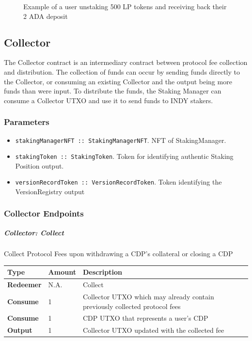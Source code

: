 \documentclass{article}
\begin{document}
\begin{sloppypar}
\hypertarget{liquidity-close-figure}{%
\begin{figure}[htbp]
\centering

\caption{Example of a user unstaking 500 LP tokens and receiving
back their 2 ADA deposit}
\label{liquidity-close-figure}
\end{figure}}

\hypertarget{collector}{%
\subsection{Collector}\label{collector}}

The Collector contract is an intermediary contract between protocol fee
collection and distribution. The collection of funds can occur by
sending funds directly to the Collector, or consuming an existing
Collector and the output being more funds than were input. To distribute
the funds, the Staking Manager can consume a Collector UTXO and use it
to send funds to INDY stakers.

\hypertarget{parameters-1}{%
\subsubsection{Parameters}\label{parameters-1}}

\begin{itemize}
\item
  \texttt{stakingManagerNFT~::~StakingManagerNFT}. NFT of
  StakingManager.
\item
  \texttt{stakingToken~::~StakingToken}. Token for identifying authentic
  Staking Position output.
\item
  \texttt{versionRecordToken~::~VersionRecordToken}. Token identifying
  the VersionRegistry output
\end{itemize}

\hypertarget{collector-endpoints}{%
\subsubsection{Collector Endpoints}\label{collector-endpoints}}

\hypertarget{collector-collect}{%
\subparagraph{Collector: Collect}\label{collector-collect}}

Collect Protocol Fees upon withdrawing a CDP's collateral or closing a
CDP

\begin{tabularx}{\linewidth}{l|l|L}
\toprule
\textbf{Type} & \textbf{Amount} & \textbf{Description}
\tabularnewline
\midrule
\endhead
\textbf{Redeemer} & N.A. & Collect
\tabularnewline
\midrule
\textbf{Consume} & 1 & Collector UTXO which may already contain
previously collected protocol fees
\tabularnewline
\midrule
\textbf{Consume} & 1 & CDP UTXO that represents a user's
CDP
\tabularnewline
\midrule
\textbf{Output} & 1 & Collector UTXO updated with the collected
fee
\tabularnewline
\bottomrule
\end{tabularx}


\end{sloppypar}
\end{document}
